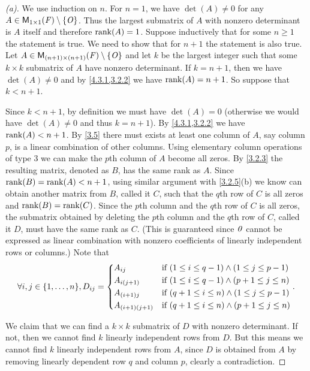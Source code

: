 \begin{proof}[(a)]
  We use induction on \(n\).
  For \(n = 1\), we have \(\det(A) \neq 0\) for any \(A \in \ms[1][1][\F] \setminus \set{\zm}\).
  Thus the largest submatrix of \(A\) with nonzero determinant is \(A\) itself and therefore \(\rk{A} = 1\).
  Suppose inductively that for some \(n \geq 1\) the statement is true.
  We need to show that for \(n + 1\) the statement is also true.
  Let \(A \in \ms[(n + 1)][(n + 1)][\F] \setminus \set{\zm}\) and let \(k\) be the largest integer such that some \(k \times k\) submatrix of \(A\) have nonzero determinant.
  If \(k = n + 1\), then we have \(\det(A) \neq 0\) and by \cref{4.3.1,3.2.2} we have \(\rk{A} = n + 1\).
  So suppose that \(k < n + 1\).

  Since \(k < n + 1\), by definition we must have \(\det(A) = 0\) (otherwise we would have \(\det(A) \neq 0\) and thus \(k = n + 1\)).
  By \cref{4.3.1,3.2.2} we have \(\rk{A} < n + 1\).
  By \cref{3.5} there must exists at least one column of \(A\), say column \(p\), is a linear combination of other columns.
  Using elementary column operations of type 3 we can make the \(p\)th column of \(A\) become all zeros.
  By \cref{3.2.3} the resulting matrix, denoted as \(B\), has the same rank as \(A\).
  Since \(\rk{B} = \rk{A} < n + 1\), using similar argument with \cref{3.2.5}(b) we know can obtain another matrix from \(B\), called it \(C\), such that the \(q\)th row of \(C\) is all zeros and \(\rk{B} = \rk{C}\).
  Since the \(p\)th column and the \(q\)th row of \(C\) is all zeros, the submatrix obtained by deleting the \(p\)th column and the \(q\)th row of \(C\), called it \(D\), must have the same rank as \(C\).
  (This is guaranteed since \(\mathit{0}\) cannot be expressed as linear combination with nonzero coefficients of linearly independent rows or columns.)
  Note that
  \[
    \forall i, j \in \set{1, \dots, n}, D_{i j} = \begin{dcases}
      A_{i j}             & \text{if } (1 \leq i \leq q - 1) \land (1 \leq j \leq p - 1) \\
      A_{i (j + 1)}       & \text{if } (1 \leq i \leq q - 1) \land (p + 1 \leq j \leq n) \\
      A_{(i + 1) j}       & \text{if } (q + 1 \leq i \leq n) \land (1 \leq j \leq p - 1) \\
      A_{(i + 1) (j + 1)} & \text{if } (q + 1 \leq i \leq n) \land (p + 1 \leq j \leq n)
    \end{dcases}.
  \]

  We claim that we can find a \(k \times k\) submatrix of \(D\) with nonzero determinant.
  If not, then we cannot find \(k\) linearly independent rows from \(D\).
  But this means we cannot find \(k\) linearly independent rows from \(A\), since \(D\) is obtained from \(A\) by removing linearly dependent row \(q\) and column \(p\), clearly a contradiction.


\end{proof}
